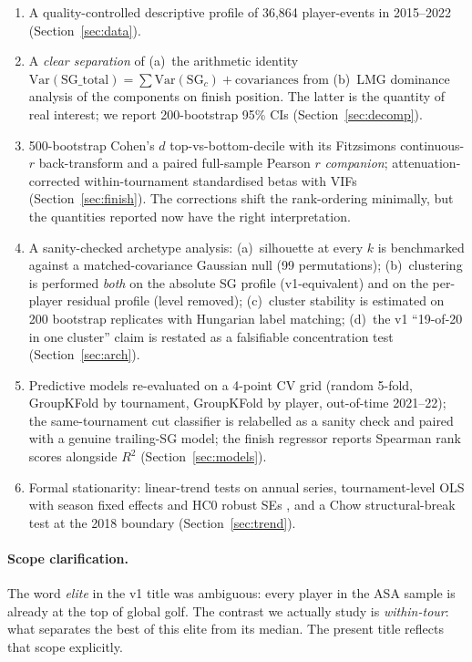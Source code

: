 \documentclass[11pt]{article}
\begin{document}
\begin{enumerate}[leftmargin=2em,itemsep=0pt]
\item A quality-controlled descriptive profile of 36{,}864 player-events in 2015--2022 (Section~\ref{sec:data}).
\item A \emph{clear separation} of (a)~the arithmetic identity $\mathrm{Var}(\text{SG\_total}) = \sum \mathrm{Var}(\text{SG}_c) + \text{covariances}$ from (b)~LMG \citep{lindeman1980lmg,gromping2007lmg,shapley1953value} dominance analysis of the components on finish position.  The latter is the quantity of real interest; we report 200-bootstrap 95\% CIs (Section~\ref{sec:decomp}).
\item 500-bootstrap Cohen's $d$ top-vs-bottom-decile with its Fitzsimons \citep{fitzsimons2008death} continuous-$r$ back-transform and a paired full-sample Pearson $r$ \emph{companion}; attenuation-corrected within-tournament standardised betas with VIFs (Section~\ref{sec:finish}).  The corrections shift the rank-ordering minimally, but the quantities reported now have the right interpretation.
\item A sanity-checked archetype analysis: (a)~silhouette at every $k$ is benchmarked against a matched-covariance Gaussian null (99 permutations); (b)~clustering is performed \emph{both} on the absolute SG profile (v1-equivalent) and on the per-player residual profile (level removed); (c)~cluster stability is estimated on 200 bootstrap replicates with Hungarian label matching; (d)~the v1 ``19-of-20 in one cluster'' claim is restated as a falsifiable concentration test (Section~\ref{sec:arch}).
\item Predictive models re-evaluated on a 4-point CV grid (random 5-fold, GroupKFold by tournament, GroupKFold by player, out-of-time 2021--22); the same-tournament cut classifier is relabelled as a sanity check and paired with a genuine trailing-SG model; the finish regressor reports Spearman rank scores alongside $R^2$ (Section~\ref{sec:models}).
\item Formal stationarity: linear-trend tests on annual series, tournament-level OLS with season fixed effects and HC0 robust SEs \citep{white1980robust}, and a Chow \citep{chow1960tests} structural-break test at the 2018 boundary (Section~\ref{sec:trend}).
\end{enumerate}

\paragraph{Scope clarification.}  The word \emph{elite} in the v1 title was ambiguous: every player in the ASA sample is already at the top of global golf.  The contrast we actually study is \emph{within-tour}: what separates the best of this elite from its median.  The present title reflects that scope explicitly.
\end{document}
